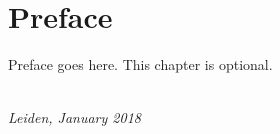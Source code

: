 \chapter*{Preface}

Preface goes here. This chapter is optional.

\begin{flushright}
{\makeatletter\itshape
    \@firstname\ \@lastname \\
    Leiden, January 2018
\makeatother}
\end{flushright}